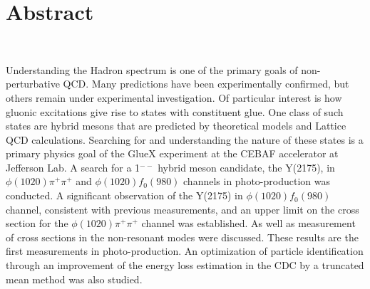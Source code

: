 \section*{Abstract} %

~\par Understanding the Hadron spectrum is one of the primary goals of non-perturbative QCD. Many predictions have been experimentally confirmed, but others remain under experimental investigation. Of particular interest is how gluonic excitations give rise to states with constituent glue. One class of such states are hybrid mesons that are predicted by theoretical models and Lattice QCD calculations. Searching for and understanding the nature of these states is a primary physics goal of the GlueX experiment at the CEBAF accelerator at Jefferson Lab. A search for a 1$^{--}$ hybrid meson candidate, the Y(2175), in $\phi(1020)\pi^{+}\pi^{+}$ and $\phi(1020)f_{0}(980)$ channels in photo-production was conducted. A significant observation of the Y(2175) in $\phi(1020)f_{0}(980)$ channel, consistent with previous measurements, and an upper limit on the cross section for the $\phi(1020)\pi^{+}\pi^{+}$ channel was established. As well as measurement of cross sections in the non-resonant modes were discussed. These results are the first measurements in photo-production. An optimization of particle identification through an improvement of the energy loss estimation in the CDC by a truncated mean method was also studied.